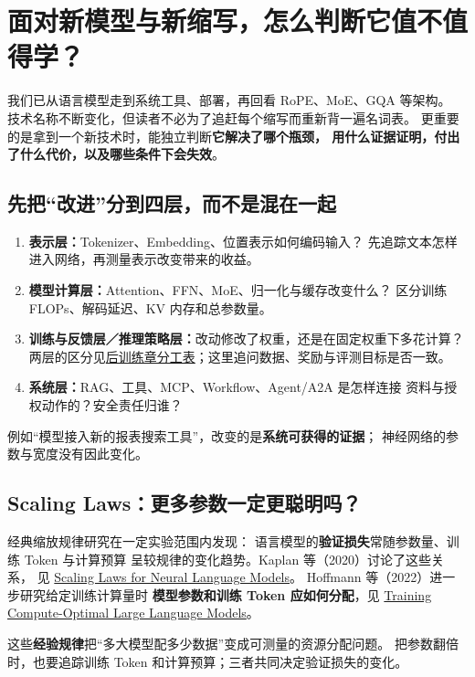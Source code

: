 \chapterrule
\section{面对新模型与新缩写，怎么判断它值不值得学？}
\label{intro:23e-tech-judgement}



我们已从语言模型走到系统工具、部署，再回看 RoPE、MoE、GQA 等架构。
技术名称不断变化，但读者不必为了追赶每个缩写而重新背一遍名词表。
更重要的是拿到一个新技术时，能独立判断\textbf{它解决了哪个瓶颈，
用什么证据证明，付出了什么代价，以及哪些条件下会失效}。

\subsection{先把“改进”分到四层，而不是混在一起}

\begin{enumerate}
\item \textbf{表示层：}Tokenizer、Embedding、位置表示如何编码输入？
先追踪文本怎样进入网络，再测量表示改变带来的收益。
\item \textbf{模型计算层：}Attention、FFN、MoE、归一化与缓存改变什么？
区分训练 FLOPs、解码延迟、KV 内存和总参数量。
\item \textbf{训练与反馈层／推理策略层：}改动修改了权重，还是在固定权重下多花计算？
两层的区分见\hyperref[sec:training-inference-roles]{后训练章分工表}；这里追问数据、奖励与评测目标是否一致。
\item \textbf{系统层：}RAG、工具、MCP、Workflow、Agent/A2A 是怎样连接
资料与授权动作的？安全责任归谁？
\end{enumerate}
例如“模型接入新的报表搜索工具”，改变的是\textbf{系统可获得的证据}；
神经网络的参数与宽度没有因此变化。

\subsection{Scaling Laws：更多参数一定更聪明吗？}

经典缩放规律研究在一定实验范围内发现：
语言模型的\textbf{验证损失}常随参数量、训练 Token 与计算预算
呈较规律的变化趋势。Kaplan 等（2020）讨论了这些关系，
见 \href{https://arxiv.org/abs/2001.08361}{Scaling Laws for Neural Language Models}。
Hoffmann 等（2022）进一步研究给定训练计算量时
\textbf{模型参数和训练 Token 应如何分配}，见
\href{https://arxiv.org/abs/2203.15556}{Training Compute-Optimal Large Language Models}。

这些\textbf{经验规律}把“多大模型配多少数据”变成可测量的资源分配问题。
把参数翻倍时，也要追踪训练 Token 和计算预算；三者共同决定验证损失的变化。

